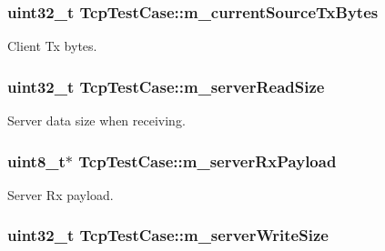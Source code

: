 \subsubsection[{\texorpdfstring{m\+\_\+current\+Source\+Tx\+Bytes}{m_currentSourceTxBytes}}]{\setlength{\rightskip}{0pt plus 5cm}uint32\+\_\+t Tcp\+Test\+Case\+::m\+\_\+current\+Source\+Tx\+Bytes\hspace{0.3cm}{\ttfamily [private]}}\hypertarget{classTcpTestCase_a41135a441155aab8e7d80acdf7c1a959}{}\label{classTcpTestCase_a41135a441155aab8e7d80acdf7c1a959}


Client Tx bytes. 

\subsubsection[{\texorpdfstring{m\+\_\+server\+Read\+Size}{m_serverReadSize}}]{\setlength{\rightskip}{0pt plus 5cm}uint32\+\_\+t Tcp\+Test\+Case\+::m\+\_\+server\+Read\+Size\hspace{0.3cm}{\ttfamily [private]}}\hypertarget{classTcpTestCase_a0487d4363885a37e702f1d6576435f0f}{}\label{classTcpTestCase_a0487d4363885a37e702f1d6576435f0f}


Server data size when receiving. 

\subsubsection[{\texorpdfstring{m\+\_\+server\+Rx\+Payload}{m_serverRxPayload}}]{\setlength{\rightskip}{0pt plus 5cm}uint8\+\_\+t$\ast$ Tcp\+Test\+Case\+::m\+\_\+server\+Rx\+Payload\hspace{0.3cm}{\ttfamily [private]}}\hypertarget{classTcpTestCase_af1647be1c24b49579653f2c691bc802b}{}\label{classTcpTestCase_af1647be1c24b49579653f2c691bc802b}


Server Rx payload. 

\subsubsection[{\texorpdfstring{m\+\_\+server\+Write\+Size}{m_serverWriteSize}}]{\setlength{\rightskip}{0pt plus 5cm}uint32\+\_\+t Tcp\+Test\+Case\+::m\+\_\+server\+Write\+Size\hspace{0.3cm}{\ttfamily [private]}}\hypertarget{classTcpTestCase_adc7913a86c86cc101b620d153b7b1af9}{}\label{classTcpTestCase_adc7913a86c86cc101b620d153b7b1af9}


